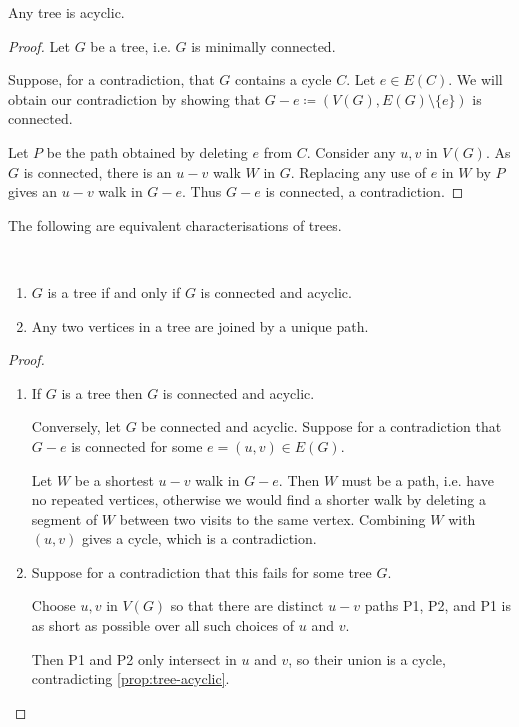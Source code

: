 \begin{proposition}\label{prop:tree-acyclic}
Any tree is acyclic.
\end{proposition}

\begin{proof}
Let $G$ be a tree, i.e. $G$ is minimally connected.

Suppose, for a contradiction, that $G$ contains a cycle $C$. Let $e \in E(C)$. We will obtain our contradiction by showing that $G-e \coloneqq (V(G),E(G)\setminus\{e\})$ is connected. 

Let $P$ be the path obtained by deleting $e$ from $C$. Consider any $u,v$ in $V(G)$. As $G$ is connected, there is an $u-v$ walk $W$ in $G$. Replacing any use of $e$ in $W$ by $P$ gives an $u-v$ walk in $G-e$. Thus $G-e$ is connected, a contradiction.
\end{proof}

The following are equivalent characterisations of trees.
\begin{lemma}\label{lemma:tree-char} \
\begin{enumerate}[label=(\roman*)]
\item $G$ is a tree if and only if $G$ is connected and acyclic.
\item Any two vertices in a tree are joined by a unique path.
\end{enumerate}
\end{lemma}

\begin{proof} \
\begin{enumerate}[label=(\roman*)]
\item If $G$ is a tree then $G$ is connected and acyclic.

Conversely, let $G$ be connected and acyclic. Suppose for a contradiction that $G-e$ is connected for some $e = (u,v) \in E(G)$.

Let $W$ be a shortest $u-v$ walk in $G-e$. Then $W$ must be a path, i.e. have no repeated vertices, otherwise we would find a shorter walk by deleting a segment of $W$ between two visits to the same vertex. Combining $W$ with $(u,v)$ gives a cycle, which is a contradiction.

\item Suppose for a contradiction that this fails for some tree $G$. 

Choose $u,v$ in $V(G)$ so that there are distinct $u-v$ paths P1, P2, and P1 is as short as possible over all such choices of $u$ and $v$.

Then P1 and P2 only intersect in $u$ and $v$, so their union is a cycle, contradicting \cref{prop:tree-acyclic}.
\end{enumerate}
\end{proof}

